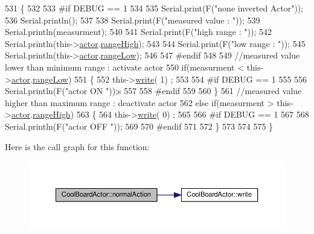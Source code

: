 \begin{DoxyCode}
531 \{
532 
533 \textcolor{preprocessor}{#if DEBUG == 1}
534     
535     Serial.print(F(\textcolor{stringliteral}{"none inverted Actor"}));
536     Serial.println();
537 
538     Serial.print(F(\textcolor{stringliteral}{"measured value : "}));
539     Serial.println(measurment);
540 
541     Serial.print(F(\textcolor{stringliteral}{"high range : "}));
542     Serial.println(this->\hyperlink{class_cool_board_actor_a8f190db9f7a39fddbcef7f152da970e9}{actor}.\hyperlink{struct_cool_board_actor_1_1state_a6e5cd6c5cd44e2decfd8d4df1853f8e3}{rangeHigh});
543 
544     Serial.print(F(\textcolor{stringliteral}{"low range : "}));
545     Serial.println(this->\hyperlink{class_cool_board_actor_a8f190db9f7a39fddbcef7f152da970e9}{actor}.\hyperlink{struct_cool_board_actor_1_1state_a43f891c9fb3bb63575c27cec860de55a}{rangeLow});
546 
547 \textcolor{preprocessor}{#endif}
548 
549     \textcolor{comment}{//measured value lower than minimum range : activate actor}
550     \textcolor{keywordflow}{if}(measurment < this->\hyperlink{class_cool_board_actor_a8f190db9f7a39fddbcef7f152da970e9}{actor}.\hyperlink{struct_cool_board_actor_1_1state_a43f891c9fb3bb63575c27cec860de55a}{rangeLow})
551     \{
552         this->\hyperlink{class_cool_board_actor_a958786ff01ea1056ee72c72d439f86da}{write}( 1) ;
553 
554 \textcolor{preprocessor}{    #if DEBUG == 1 }
555 
556         Serial.println(F(\textcolor{stringliteral}{"actor ON "}));s
557     
558 \textcolor{preprocessor}{    #endif}
559                 
560     \}
561     \textcolor{comment}{//measured value higher than maximum range : deactivate actor}
562     \textcolor{keywordflow}{else} \textcolor{keywordflow}{if}(measurment > this->\hyperlink{class_cool_board_actor_a8f190db9f7a39fddbcef7f152da970e9}{actor}.\hyperlink{struct_cool_board_actor_1_1state_a6e5cd6c5cd44e2decfd8d4df1853f8e3}{rangeHigh})
563     \{
564         this->\hyperlink{class_cool_board_actor_a958786ff01ea1056ee72c72d439f86da}{write}( 0) ;
565 
566 \textcolor{preprocessor}{    #if DEBUG == 1 }
567 
568         Serial.println(F(\textcolor{stringliteral}{"actor OFF "}));
569     
570 \textcolor{preprocessor}{    #endif}
571     
572     \}
573 
574 
575 \}
\end{DoxyCode}
Here is the call graph for this function\+:
\nopagebreak
\begin{figure}[H]
\begin{center}
\leavevmode
\includegraphics[width=350pt]{dc/d69/class_cool_board_actor_a81229abf5895f4d3b0355050b822b438_cgraph}
\end{center}
\end{figure}
